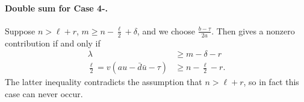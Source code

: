\paragraph{Double sum for Case 4\ts-.}
Suppose $n > \ell + r$,
$m \ge n - \frac{\ell}{2} + \delta$, and we choose $\frac{b-\tau}{2a}$.
Then  gives a nonzero contribution if and only if
\begin{align*}
  \lambda &\geq m - \delta - r \\
  \frac{\ell}{2} = v(au-\bar d \bar u - \tau) & \geq n - \frac{\ell}{2} - r.
\end{align*}
The latter inequality contradicts the assumption that $n > \ell + r$,
so in fact this case can never occur.

\newpage
